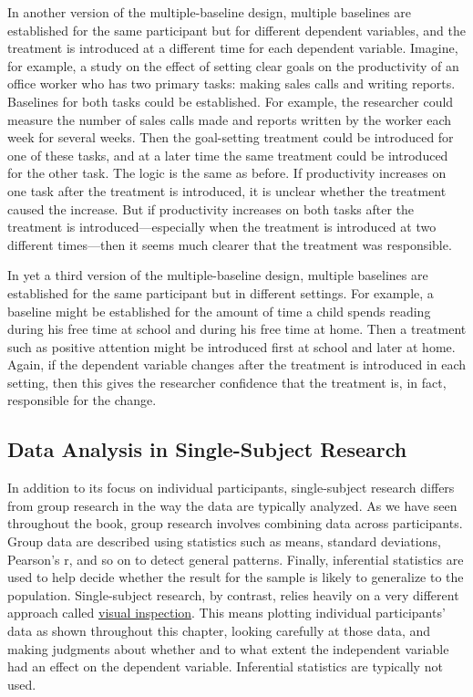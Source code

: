 \documentclass[
]{krantz}
\begin{document}
In another version of the multiple-baseline design, multiple baselines are established for the same participant but for different dependent variables, and the treatment is introduced at a different time for each dependent variable. Imagine, for example, a study on the effect of setting clear goals on the productivity of an office worker who has two primary tasks: making sales calls and writing reports. Baselines for both tasks could be established. For example, the researcher could measure the number of sales calls made and reports written by the worker each week for several weeks. Then the goal-setting treatment could be introduced for one of these tasks, and at a later time the same treatment could be introduced for the other task. The logic is the same as before. If productivity increases on one task after the treatment is introduced, it is unclear whether the treatment caused the increase. But if productivity increases on both tasks after the treatment is introduced---especially when the treatment is introduced at two different times---then it seems much clearer that the treatment was responsible.

In yet a third version of the multiple-baseline design, multiple baselines are established for the same participant but in different settings. For example, a baseline might be established for the amount of time a child spends reading during his free time at school and during his free time at home. Then a treatment such as positive attention might be introduced first at school and later at home. Again, if the dependent variable changes after the treatment is introduced in each setting, then this gives the researcher confidence that the treatment is, in fact, responsible for the change.

\hypertarget{data-analysis-in-single-subject-research}{%
\subsection*{Data Analysis in Single-Subject Research}\label{data-analysis-in-single-subject-research}}


In addition to its focus on individual participants, single-subject research differs from group research in the way the data are typically analyzed. As we have seen throughout the book, group research involves combining data across participants. Group data are described using statistics such as means, standard deviations, Pearson's r, and so on to detect general patterns. Finally, inferential statistics are used to help decide whether the result for the sample is likely to generalize to the population. Single-subject research, by contrast, relies heavily on a very different approach called \protect\hyperlink{visual-inspection}{visual inspection}. This means plotting individual participants' data as shown throughout this chapter, looking carefully at those data, and making judgments about whether and to what extent the independent variable had an effect on the dependent variable. Inferential statistics are typically not used.
\end{document}
